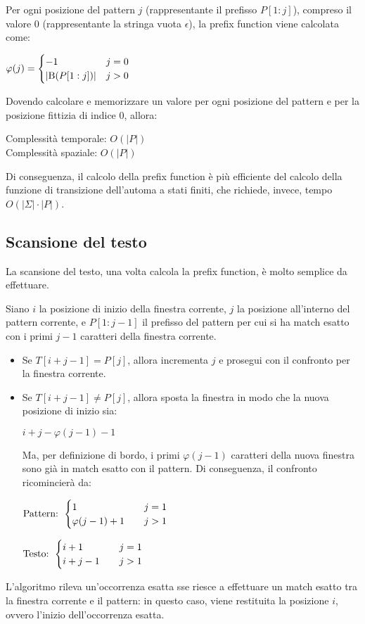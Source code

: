 Per ogni posizione del pattern $j$ (rappresentante il prefisso $P[1:j]$), compreso il valore 0 (rappresentante la stringa vuota $\epsilon$), la prefix function viene calcolata come:
\begin{center}
    $\varphi(j) = \begin{cases}
        -1 & j = 0 \\
        |\textnormal{B}(P[1:j])| & j > 0
    \end{cases}$
\end{center}
Dovendo calcolare e memorizzare un valore per ogni posizione del pattern e per la posizione fittizia di indice 0, allora:
\begin{center}
    Complessità temporale: $O(|P|)$\\
    Complessità spaziale: $O(|P|)$
\end{center}
Di conseguenza, il calcolo della prefix function è più efficiente del calcolo della funzione di transizione dell'automa a stati finiti, che richiede, invece, tempo $O(|\Sigma| \cdot |P|)$.
\subsection{Scansione del testo}
La scansione del testo, una volta calcola la prefix function, è molto semplice da effettuare.

Siano $i$ la posizione di inizio della finestra corrente, $j$ la posizione all'interno del pattern corrente, e $P[1:j-1]$ il prefisso del pattern per cui si ha match esatto con i primi $j-1$ caratteri della finestra corrente.
\begin{itemize}
    \item Se $T[i + j - 1] = P[j]$, allora incrementa $j$ e prosegui con il    confronto per la finestra corrente.\\
    \item Se $T[i + j - 1] \neq P[j]$, allora sposta la finestra in modo che la nuova posizione di inizio sia:
    \begin{center}
        $i + j - \varphi(j-1) - 1$
    \end{center}
    Ma, per definizione di bordo, i primi $\varphi(j - 1)$ caratteri della nuova finestra sono già in match esatto con il pattern.
    Di conseguenza, il confronto ricomincierà da:
    \begin{center}
        $\textnormal{Pattern: } \begin{cases}
            1 & \quad j = 1 \\
            \varphi(j-1) + 1 & \quad j > 1
        \end{cases}$
    \end{center}
    \begin{center}
        $\textnormal{Testo: } \begin{cases}
            i + 1 & \quad j = 1 \\
            i + j - 1 & \quad j > 1
        \end{cases}$
    \end{center}
\end{itemize}
L'algoritmo rileva un'occorrenza esatta sse riesce a effettuare un match esatto tra la finestra corrente e il pattern: in questo caso, viene restituita la posizione $i$, ovvero l'inizio dell'occorrenza esatta.

